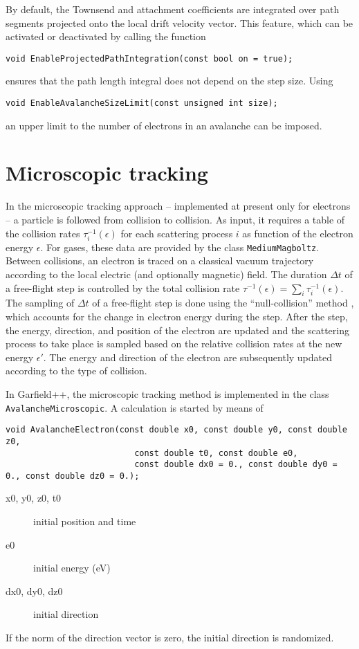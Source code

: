 By default, the Townsend and attachment coefficients are integrated over 
path segments projected onto the local drift velocity vector. 
This feature, which can be activated or deactivated by calling the function
\begin{lstlisting}
void EnableProjectedPathIntegration(const bool on = true);
\end{lstlisting} 
ensures that the path length integral does not depend on the step size.
Using 
\begin{lstlisting}
void EnableAvalancheSizeLimit(const unsigned int size);
\end{lstlisting}
an upper limit to the number of electrons in an avalanche can be imposed.

\section{Microscopic tracking}\label{Sec:MicroscopicTracking}
In the microscopic tracking approach -- implemented at present only for electrons --
a particle is followed from collision to collision. As input, it requires 
a table of the collision rates $\tau^{-1}_{i}\left(\epsilon\right)$ for each 
scattering process $i$ as function of the electron energy $\epsilon$. 
For gases, these data are provided by the class \texttt{MediumMagboltz}.
Between collisions, an electron is traced on a classical vacuum trajectory 
according to the local electric (and optionally magnetic) field. 
The duration $\Delta{t}$ of a free-flight step is controlled by the 
total collision rate 
$\tau^{-1}\left(\epsilon\right) = 
\sum_{i}\tau^{-1}_{i}\left(\epsilon\right)$.
The sampling of $\Delta{t}$ of a free-flight step is done using the 
``null-collision'' method \cite{Skullerud1968}, which accounts for 
the change in electron energy during the step. 
After the step, the energy, direction, and position of the electron 
are updated and the scattering process to take place is sampled based 
on the relative collision rates at the new energy $\epsilon'$.
The energy and direction of the electron are subsequently updated 
according to the type of collision.

In Garfield++, the microscopic tracking method is implemented in the class 
\texttt{AvalancheMicroscopic}. A calculation is started by means of
\begin{lstlisting}
void AvalancheElectron(const double x0, const double y0, const double z0,
                          const double t0, const double e0,
                          const double dx0 = 0., const double dy0 = 0., const double dz0 = 0.);
\end{lstlisting}
\begin{description}
  \item[x0, y0, z0, t0] initial position and time
  \item[e0] initial energy (eV)
  \item[dx0, dy0, dz0] initial direction 
\end{description}
If the norm of the direction vector is zero, 
the initial direction is randomized.

